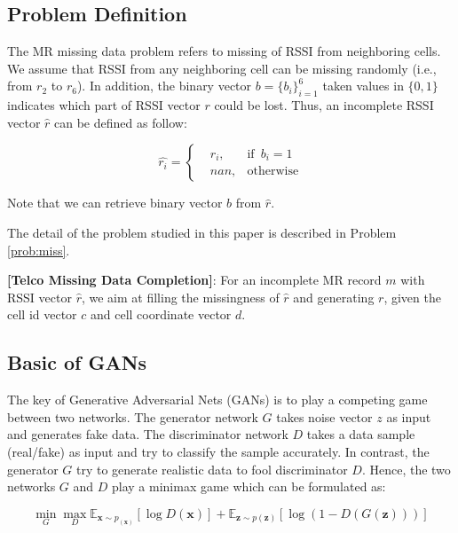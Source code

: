 \subsection{Problem Definition}
The MR missing data problem refers to missing of RSSI from neighboring cells. We assume that RSSI from any neighboring cell can be missing randomly (i.e., from $r_2$ to $r_6$). In addition, the binary vector $b=\{b_i\}_{i=1}^6$ taken values in $\{0, 1\}$ indicates which part of RSSI vector $r$ could be lost. Thus, an incomplete RSSI vector $\hat{r}$ can be defined as follow:

\begin{equation}\label{eq:rssi}
\hat{r_i}=\left\{
\begin{aligned}
&r_i, & \text{if}\enspace b_i=1 \\
&nan,  & \text{otherwise}
\end{aligned}
\right.
\end{equation}

Note that we can retrieve binary vector $b$ from $\hat{r}$.

The detail of the problem studied in this paper is described in Problem \ref{prob:miss}.

\begin{problem}\label{prob:miss}
  \textbf{[Telco Missing Data Completion]}: For an incomplete MR record $m$ with RSSI vector $\hat{r}$, we aim at filling the missingness of $\hat{r}$ and generating $r$, given the cell id vector $c$ and cell coordinate vector $d$.
\end{problem}

\subsection{Basic of GANs}
The key of Generative Adversarial Nets (GANs) \cite{DBLP:conf/nips/GoodfellowPMXWOCB14} is to play a competing game between two networks. The generator network $G$ takes noise vector $z$ as input and generates fake data. The discriminator network $D$ takes a data sample (real/fake) as input and try to classify the sample accurately. In contrast, the generator $G$ try to generate realistic data to fool discriminator $D$. Hence, the two networks $G$ and $D$ play a minimax game which can be formulated as:

\begin{equation}\label{eq:gan}
  \min\limits_G \max\limits_D \mathbb{E}_{\textbf{x}\sim p_(\textbf{x})}[\log D(\textbf{x})]+\mathbb{E}_{\textbf{z}\sim p( \textbf{z})}[\log(1-D(G(\textbf{z})))]
\end{equation}

